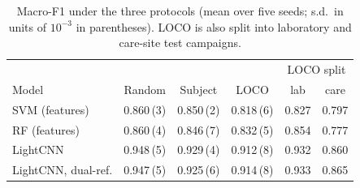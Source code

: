 \begin{table}[t]
\centering
\caption{Macro-F1 under the three protocols (mean over five seeds; s.d.\ in units of $10^{-3}$ in parentheses). LOCO is also split into laboratory and care-site test campaigns.}
\label{tab:protocol}
\setlength{\tabcolsep}{2.5pt}
\footnotesize
\begin{tabular}{lccccc}
\toprule
 & & & & \multicolumn{2}{c}{LOCO split} \\
Model & Random & Subject & LOCO & lab & care \\
\midrule
SVM (features) & 0.860\,(3) & 0.850\,(2) & 0.818\,(6) & 0.827 & 0.797 \\
RF (features) & 0.860\,(4) & 0.846\,(7) & 0.832\,(5) & 0.854 & 0.777 \\
LightCNN & 0.948\,(5) & 0.929\,(4) & 0.912\,(8) & 0.932 & 0.860 \\
LightCNN, dual-ref. & 0.947\,(5) & 0.925\,(6) & 0.914\,(8) & 0.933 & 0.865 \\
\bottomrule
\end{tabular}
\end{table}